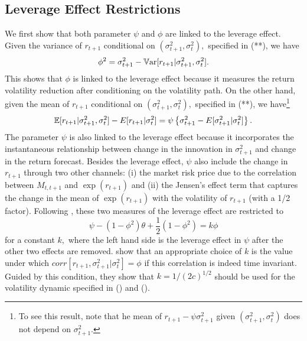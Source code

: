 \documentclass[11pt, letterpaper, twoside]{article}
\begin{document}
\subsection{Leverage Effect Restrictions}

We first show that both parameter $\psi $ and $\phi $ are linked to the leverage effect. Given the variance of $r_{t+1}$ conditional on $(\sigma _{t+1}^{2},\sigma _{t}^{2}),$ specified in (**), we have
%
\begin{equation*}
    \phi ^{2}=\sigma _{t+1}^{2}-\operatorname{\mathbb{V}ar}[r_{t+1}|\sigma _{t+1}^{2},\sigma _{t}^{2}].
\end{equation*}
%
This shows that $\phi $ is linked to the leverage effect because it measures the return volatility reduction after conditioning on the volatility path.  On the other hand, given the mean of $r_{t+1}$ conditional on $(\sigma _{t+1}^{2},\sigma _{t}^{2}),$ specified in (**), we have\footnote{To see this result, note that he mean of $r_{t+1}-\psi \sigma _{t+1}^{2}$ given $(\sigma _{t+1}^{2},\sigma _{t}^{2})$ does not depend on $\sigma
_{t+1}^{2}.$}%
%
\begin{equation}
    \operatorname{\mathbb{E}}[r_{t+1}|\sigma _{t+1}^{2},\sigma _{t}^{2}]-E[r_{t+1}|\sigma _{t}^{2}]=\psi \left \{ \sigma _{t+1}^{2}-E[\sigma _{t+1}^{2}|\sigma _{t}^{2}]\right \} .
\end{equation}%
The parameter $\psi $ is also linked to the leverage effect because it incorporates the instantaneous relationship between change in the innovation in $\sigma _{t+1}^{2}$ and change in the return forecast. Besides the leverage effect, $\psi $ also include the change in $r_{t+1}$ through two other channels: (i) the market risk price due to the correlation between $M_{t,t+1}$ and $\exp (r_{t+1})$ and (ii) the Jensen's effect term that captures the change in the mean of $\exp (r_{t+1})$ with the volatility of $ r_{t+1}$ (with a 1/2 factor). Following \textcite{han2018leverage}, these two measures of the leverage effect are restricted to 
%
\begin{equation}
    \psi -(1-\phi ^{2})\theta +\frac{1}{2}(1-\phi ^{2})=k\phi 
    \label{leverage restriction}
\end{equation}
%
for a constant $k,$ where the left hand side is the leverage effect in $\psi$ after the other two effects are removed. \Textcite{han2018leverage} show that an appropriate choice of $k$ is the value under which $corr[r_{t+1},\sigma _{t+1}^{2}|\sigma _{t}^{2}]=\phi $ if this correlation is indeed time invariant. Guided by this condition, they show that $k=1/(2c)^{1/2}$ should be used for the volatility dynamic specified in () and ().
\end{document}
